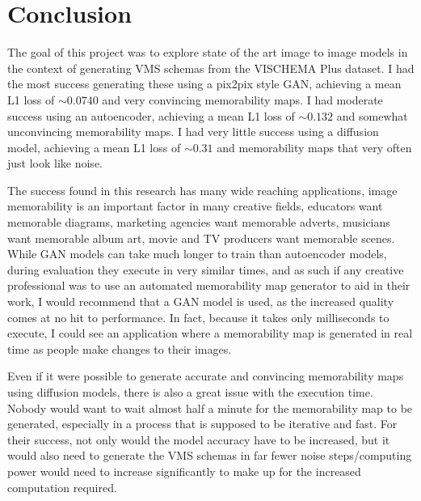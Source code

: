 \documentclass{UoYCSproject}
\begin{document}
\chapter{Conclusion}



The goal of this project was to explore state of the art image to image models in the context of generating VMS schemas from the VISCHEMA Plus dataset. I had the most success generating these using a pix2pix style GAN, achieving a mean L1 loss of \(\sim 0.0740 \) and very convincing memorability maps. I had moderate success using an autoencoder, achieving a mean L1 loss of \(\sim 0.132\) and somewhat unconvincing memorability maps. I had very little success using a diffusion model, achieving a mean L1 loss of \(\sim 0.31 \) and memorability maps that very often just look like noise.

The success found in this research has many wide reaching applications, image memorability is an important factor in many creative fields, educators want memorable diagrams, marketing agencies want memorable adverts, musicians want memorable album art, movie and TV producers want memorable scenes. While GAN models can take much longer to train than autoencoder models, during evaluation they execute in very similar times, and as such if any creative professional was to use an automated memorability map generator to aid in their work, I would recommend that a GAN model is used, as the increased quality comes at no hit to performance. In fact, because it takes only milliseconds to execute, I could see an application where a memorability map is generated in real time as people make changes to their images.

Even if it were possible to generate accurate and convincing memorability maps using diffusion models, there is also a great issue with the execution time. Nobody would want to wait almost half a minute for the memorability map to be generated, especially in a process that is supposed to be iterative and fast. For their success, not only would the model accuracy have to be increased, but it would also need to generate the VMS schemas in far fewer noise steps/computing power would need to increase significantly to make up for the increased computation required. 
\end{document}

